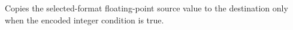Copies the selected-format floating-point source value to the destination only when the encoded integer condition is true.
